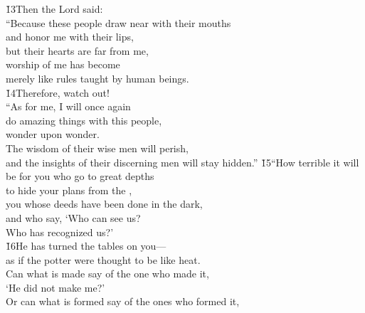 \begin{poetry}
\poeml \v{13}Then the Lord said: \\
\poeml ``Because these people draw near with their mouths \\
\poemll    and honor me with their lips, \\
\poemlll       but their hearts are far from me, \\
\poeml worship of me has become \\
\poemll    merely like rules taught by human beings. \\
\poeml \v{14}Therefore, watch out! \\
\poeml ``As for me, I will once again \\
\poemll    do amazing things with this people, \\
\poemlll       wonder upon wonder. \\
\poeml The wisdom of their wise men will perish, \\
\poemll    and the insights of their discerning men will stay hidden.''
\poeml \v{15}``How terrible it will be for you who go to great depths \\
\poemll    to hide your plans from the , \\
\poeml you whose deeds have been done in the dark, \\
\poemll    and who say, `Who can see us? \\
\poemlll       Who has recognized us?' \\
\poeml \v{16}He has turned the tables on you--- \\
\poemll    as if the potter were thought to be like heat. \\
\poeml Can what is made say of the one who made it, \\
\poemll    `He did not make me?' \\
\poeml Or can what is formed say of the ones who formed it, \\

\end{poetry}
